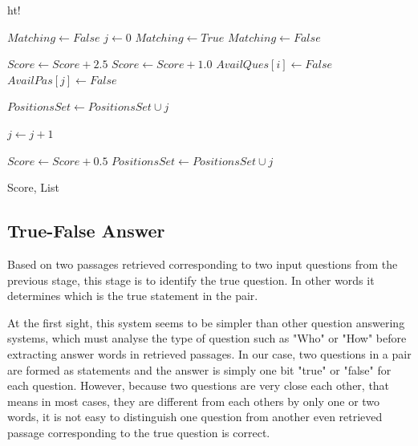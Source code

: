 \documentclass[10pt,a4paper]{article}
\numberwithin{algorithm}{section}  %
\begin{document}
\begin{algorithm}    {ht!}
\begin{algorithmic} [1]
\STATE{}
	\STATE $Matching \gets False$
	\STATE $j \gets 0$
		\STATE $Matching \gets True$
				\STATE $Matching \gets False$
			\ENDIF
		\ENDFOR
		
		\STATE $Score \gets Score + 2.5$ 
		\ELSE 
		\STATE $Score \gets Score + 1.0$ 
		\ENDIF
		\STATE $AvailQues[i] \gets False$  
		\STATE $AvailPas[j] \gets False $ 
				
		\STATE $PositionsSet \gets PositionsSet \cup j$ 
	\ENDIF

		
	\STATE $j \gets j+1$
	\ENDWHILE
\ENDFOR

\STATE{}
			\STATE $Score \gets Score + 0.5$
			\STATE $PositionsSet \gets PositionsSet \cup j$ 
		\ENDIF
	\ENDFOR
\ENDFOR

\RETURN Score, List
\end{algorithmic}
\end{algorithm}

\newpage
\normalsize

\pagebreak




\newpage

\subsection{True-False Answer}
Based on two passages retrieved corresponding to two input questions from the previous stage, this stage is to identify the true question. In other words it determines which is the true statement in the pair. 

At the first sight, this system seems to be simpler than other question answering systems, which must analyse the type of question such as "Who" or "How" before extracting answer words in retrieved passages. In our case, two questions in a pair are formed as statements and the answer is simply one bit "true" or "false" for each question. However, because two questions are very close each other, that means in most cases, they are different from each others by only one or two words, it is not easy to distinguish one question from another even retrieved passage corresponding to the true question is correct.
\end{document}
